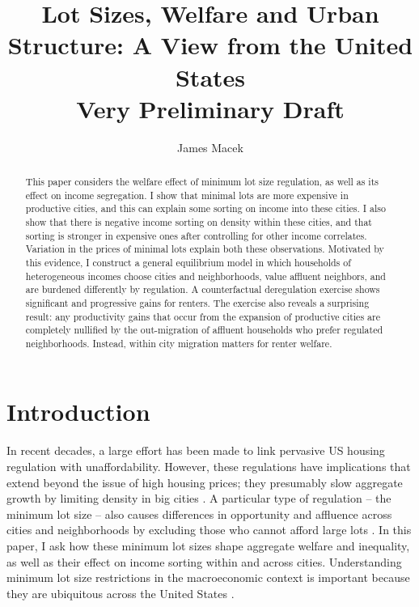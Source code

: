 \documentclass[]{article}
\title{Lot Sizes, Welfare and Urban Structure: A View from the United States \\
	Very Preliminary Draft}
\author{James Macek}
\begin{document}
\maketitle	
		
\begin{abstract}
	\scriptsize
This paper considers the welfare effect of minimum lot size regulation, as well as its effect on income segregation. I show that minimal lots are more expensive in productive cities, and this can explain some sorting on income into these cities. I also show that there is negative income sorting on density within these cities, and that sorting is stronger in expensive ones after controlling for other income correlates. Variation in the prices of minimal lots explain both these observations. Motivated by this evidence, I construct a general equilibrium model in which households of heterogeneous incomes choose cities and neighborhoods, value affluent neighbors, and are burdened differently by regulation. A counterfactual deregulation exercise shows significant and progressive gains for renters. The exercise also reveals a surprising result: any productivity gains that occur from the expansion of productive cities are completely nullified by the out-migration of affluent households who prefer regulated neighborhoods. Instead, within city migration matters for renter welfare.
\end{abstract}	
	
	\newpage	
	\section{Introduction}
		
	\paragraph*{}
	
	In recent decades, a large effort has been made to link pervasive US housing regulation with unaffordability. However, these regulations have implications that extend beyond the issue of high housing prices; they presumably slow aggregate growth by limiting density in big cities \citep{hseihmoretti,durantonpugaurbgrowth}. A particular type of regulation -- the minimum lot size -- also causes differences in opportunity and affluence across cities and neighborhoods by excluding those who cannot afford large lots \citep{Song, kulka}. In this paper, I ask how these minimum lot sizes shape aggregate welfare and inequality, as well as their effect on income sorting within and across cities. Understanding minimum lot size restrictions in the macroeconomic context is important because they are ubiquitous across the United States \citep{gyourko2021}. 
	
\end{document}
